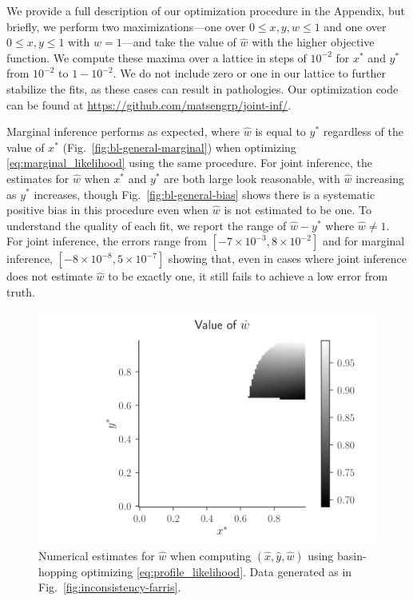 \documentclass{article}
\begin{document}
We provide a full description of our optimization procedure in the Appendix, but briefly, we perform two maximizations---one over $0 \le x,y,w \le 1$ and one over $0 \le x,y \le 1$ with $w=1$---and take the value of $\hat{w}$ with the higher objective function.
We compute these maxima over a lattice in steps of $10^{-2}$ for $x^*$ and $y^*$ from $10^{-2}$ to $1-10^{-2}$.
We do not include zero or one in our lattice to further stabilize the fits, as these cases can result in pathologies.
Our optimization code can be found at \url{https://github.com/matsengrp/joint-inf/}.

Marginal inference performs as expected, where $\hat{w}$ is equal to $y^*$ regardless of the value of $x^*$ (Fig.~\ref{fig:bl-general-marginal}) when optimizing \eqref{eq:marginal_likelihood} using the same procedure.
For joint inference, the estimates for $\hat{w}$ when $x^*$ and $y^*$ are both large look reasonable, with $\hat{w}$ increasing as $y^*$ increases, though Fig.~\ref{fig:bl-general-bias} shows there is a systematic positive bias in this procedure even when $\hat{w}$ is not estimated to be one.
To understand the quality of each fit, we report the range of $\hat{w}-y^*$ where $\hat{w}\neq 1$.
For joint inference, the errors range from $[-7\times 10^{-3}, 8\times 10^{-2}]$ and for marginal inference, $[-8\times 10^{-8}, 5\times 10^{-7}]$ showing that, even in cases where joint inference does not estimate $\hat{w}$ to be exactly one, it still fails to achieve a low error from truth.

\begin{figure}
\centering
\includegraphics[width=\textwidth]{w-hat-empirical-01}
\caption{
    Numerical estimates for $\hat{w}$ when computing $(\hat{x}, \hat{y}, \hat{w})$ using basin-hopping \cite{Wales1997} optimizing \eqref{eq:profile_likelihood}.
    Data generated as in Fig.~\ref{fig:inconsistency-farris}.
}
\label{fig:bl-general-inconsistency}
\end{figure}
\end{document}
